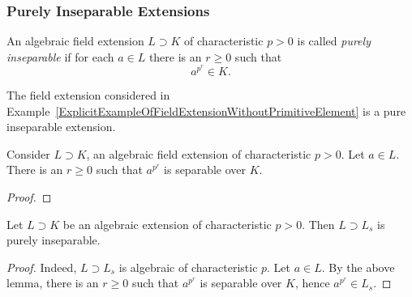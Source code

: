 \subsubsection{Purely Inseparable Extensions}

\begin{definition}
    An algebraic field extension $L\supset K$ of characteristic $p>0$ is called \emph{purely inseparable} if for each $a\in L$ there is an $r\geq 0 $ such that 
    $$
        a^{p^r} \in K.
    $$
\end{definition}
\begin{example}
    The field extension considered in Example~\ref{ExplicitExampleOfFieldExtensionWithoutPrimitiveElement} is a pure inseparable extension.
\end{example}
\begin{lemma}
    Consider $L\supset K$, an algebraic field extension of characteristic $p>0$. Let $a\in L$. There is an $r\geq 0$ such that $a^{p^r}$ is separable over $K$. 
\end{lemma}
\begin{proof}
    
\end{proof}
\begin{corollary}
    Let $L\supset K$ be an algebraic extension of characteristic $p>0$. Then $L\supset L_s$ is purely inseparable.
\end{corollary}
\begin{proof}
    Indeed, $L\supset L_s$ is algebraic of characteristic $p$. Let $a\in L$. By the above lemma, there is an $r\geq 0$ such that $a^{p^r}$ is separable over $K$, hence $a^{p^r}\in L_s$. 
\end{proof}
